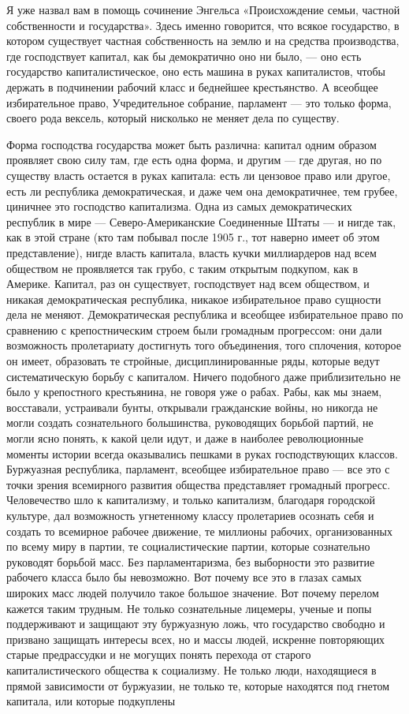 \documentclass[12pt]{article}
\newcommand{\parnum}{(\arabic{parcount})}
\newcounter{parcount}
\newenvironment{parnumbers}{%
  \par%
  \everypar{\noindent \stepcounter{parcount}\marginpar[]{\parnum}}%
}{}
\begin{document}
\begin{parnumbers}
Я уже назвал вам в помощь сочинение Энгельса «Происхождение семьи, частной собственности и государства». Здесь именно говорится, что всякое государство, в котором существует частная собственность на землю и на средства производства, где господствует капитал, как бы демократично оно ни было, — оно есть государство капиталистическое, оно есть машина в руках капиталистов, чтобы держать в подчинении рабочий класс и беднейшее крестьянство. А всеобщее избирательное право, Учредительное собрание, парламент — это только форма, своего рода вексель, который нисколько не меняет дела по существу.

Форма господства государства может быть различна: капитал одним образом проявляет свою силу там, где есть одна форма, и другим — где другая, но по существу власть остается в руках капитала: есть ли цензовое право или другое, есть ли республика демократическая, и даже чем она демократичнее, тем грубее, циничнее это господство капитализма. Одна из самых демократических республик в мире — Северо-Американские Соединенные Штаты — и нигде так, как в этой стране (кто там побывал после 1905 г., тот наверно имеет об этом представление), нигде власть капитала, власть кучки миллиардеров над всем обществом не проявляется так грубо, с таким открытым подкупом, как в Америке. Капитал, раз он существует, господствует над всем обществом, и никакая демократическая республика, никакое избирательное право сущности дела не меняют. Демократическая республика и всеобщее избирательное право по сравнению с крепостническим строем были громадным прогрессом: они дали возможность пролетариату достигнуть того объединения, того сплочения, которое он имеет, образовать те стройные, дисциплинированные ряды, которые ведут систематическую борьбу с капиталом. Ничего подобного даже приблизительно не было у крепостного крестьянина, не говоря уже о рабах. Рабы, как мы знаем, восставали, устраивали бунты, открывали гражданские войны, но никогда не могли создать сознательного большинства, руководящих борьбой партий, не могли ясно понять, к какой цели идут, и даже в наиболее революционные моменты истории всегда оказывались пешками в руках господствующих классов. Буржуазная республика, парламент, всеобщее избирательное право — все это с точки зрения всемирного развития общества представляет громадный прогресс. Человечество шло к капитализму, и только капитализм, благодаря городской культуре, дал возможность угнетенному классу пролетариев осознать себя и создать то всемирное рабочее движение, те миллионы рабочих, организованных по всему миру в партии, те социалистические партии, которые сознательно руководят борьбой масс. Без парламентаризма, без выборности это развитие рабочего класса было бы невозможно. Вот почему все это в глазах самых широких масс людей получило такое большое значение. Вот почему перелом кажется таким трудным. Не только сознательные лицемеры, ученые и попы поддерживают и защищают эту буржуазную ложь, что государство свободно и призвано защищать интересы всех, но и массы людей, искренне повторяющих старые предрассудки и не могущих понять перехода от старого капиталистического общества к социализму. Не только люди, находящиеся в прямой зависимости от буржуазии, не только те, которые находятся под гнетом капитала, или которые подкуплены 
\end{parnumbers}
\end{document}
